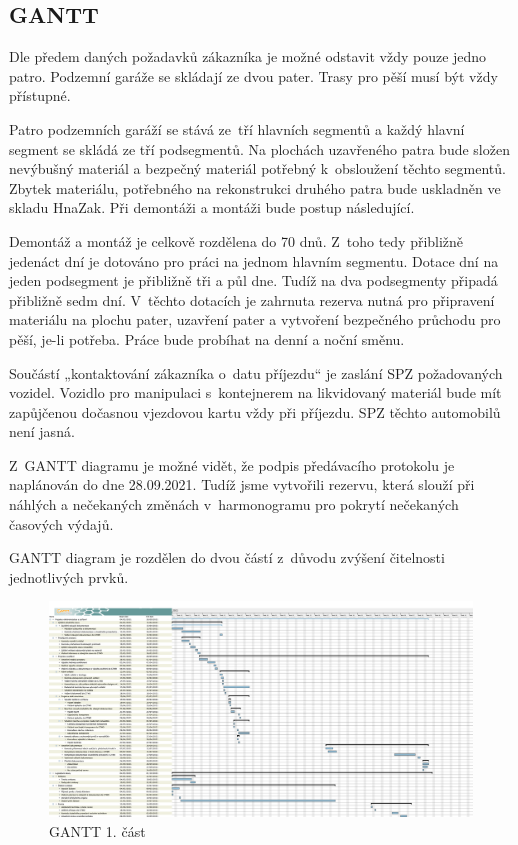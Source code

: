 \documentclass[a4paper, twoside, 11pt]{article}
\begin{document}
	\subsection{GANTT}\label{sec:gantt}
		Dle předem daných požadavků zákazníka je možné odstavit vždy pouze jedno patro. Podzemní garáže se skládají ze dvou pater. Trasy pro pěší musí být vždy přístupné.\par
		Patro podzemních garáží se stává ze~tří hlavních segmentů a každý hlavní segment se skládá ze tří podsegmentů. Na plochách uzavřeného patra bude složen nevýbušný materiál a bezpečný materiál  potřebný k~obsloužení těchto segmentů. Zbytek materiálu, potřebného na rekonstrukci druhého patra bude uskladněn ve skladu HnaZak. Při demontáži a montáži bude postup následující.\par
		Demontáž a montáž je celkově rozdělena do 70 dnů. Z~toho tedy přibližně jedenáct dní je dotováno pro práci na jednom hlavním segmentu. Dotace dní na jeden podsegment je přibližně tři a půl dne. Tudíž na dva podsegmenty připadá přibližně sedm dní. V~těchto dotacích je zahrnuta rezerva nutná pro připravení materiálu na plochu pater, uzavření pater a vytvoření bezpečného průchodu pro pěší, je-li potřeba. Práce bude probíhat na denní a noční směnu.\par
		Součástí „kontaktování zákazníka o~datu příjezdu“ je zaslání SPZ požadovaných vozidel. Vozidlo pro manipulaci s~kontejnerem na likvidovaný materiál bude mít zapůjčenou dočasnou vjezdovou kartu vždy při příjezdu. SPZ těchto automobilů není jasná.\par
		Z~GANTT diagramu je možné vidět, že podpis předávacího protokolu je naplánován do dne 28.09.2021. Tudíž jsme vytvořili rezervu, která slouží při náhlých a nečekaných změnách v~harmonogramu pro pokrytí nečekaných časových výdajů.\par
		GANTT diagram je rozdělen do dvou částí z~důvodu zvýšení čitelnosti jednotlivých prvků.
		
		\begin{figure}[H]
 				\centering
 				\includegraphics[width=1\textwidth]{files/gantt_half1.png} 
				\caption{GANTT 1. část}
				\label{fig:gantt_half1}
 		\end{figure}			
 		
\end{document}
